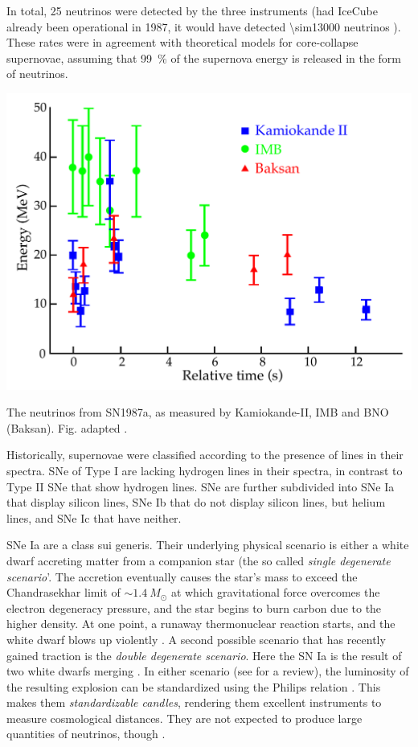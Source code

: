 \documentclass[
    a4paper, %
    fontsize=10pt, %
    twoside=false, %
    numbers=noenddot, %
    fontmethod=tex,
]{kaobook}
\begin{document}
In total, 25 neutrinos were detected by the three instruments (had IceCube already been operational in 1987, it would have detected \num{\sim13000} neutrinos ). These rates were in agreement with theoretical models for core-collapse supernovae, assuming that \SI{99}{\percent} of the supernova energy is released in the form of neutrinos.

\begin{marginfigure}
    \includegraphics{theory/sn1987a_flux.pdf}
    \caption[Neutrinos from SN1987a]{The neutrinos from SN1987a, as measured by Kamiokande-II, IMB and BNO (Baksan). Fig. adapted \cite{Grupen2005}.}
\end{marginfigure}

Historically, supernovae were classified according to the presence of lines in their spectra. SNe of Type I are lacking hydrogen lines in their spectra, in contrast to Type II SNe that show hydrogen lines. SNe are further subdivided into SNe Ia that display silicon lines, SNe Ib that do not display silicon lines, but helium lines, and SNe Ic that have neither.

SNe Ia are a class sui generis. Their underlying physical scenario is either a white dwarf accreting matter from a companion star (the so called \textit{single degenerate scenario}'. The accretion eventually causes the star's mass to exceed the Chandrasekhar limit of $\sim 1.4~M_\odot$ at which gravitational force overcomes the electron degeneracy pressure, and the star begins to burn carbon due to the higher density. At one point, a runaway thermonuclear reaction starts, and the white dwarf blows up violently . A second possible scenario that has recently gained traction is the \textit{double degenerate scenario}. Here the SN Ia is the result of two white dwarfs merging \cite{Iben1984}.
In either scenario (see  for a review), the luminosity of the resulting explosion can be standardized using the Philips relation . This makes them \textit{standardizable candles}, rendering them excellent instruments to measure cosmological distances. They are not expected to produce large quantities of neutrinos, though .
\end{document}
